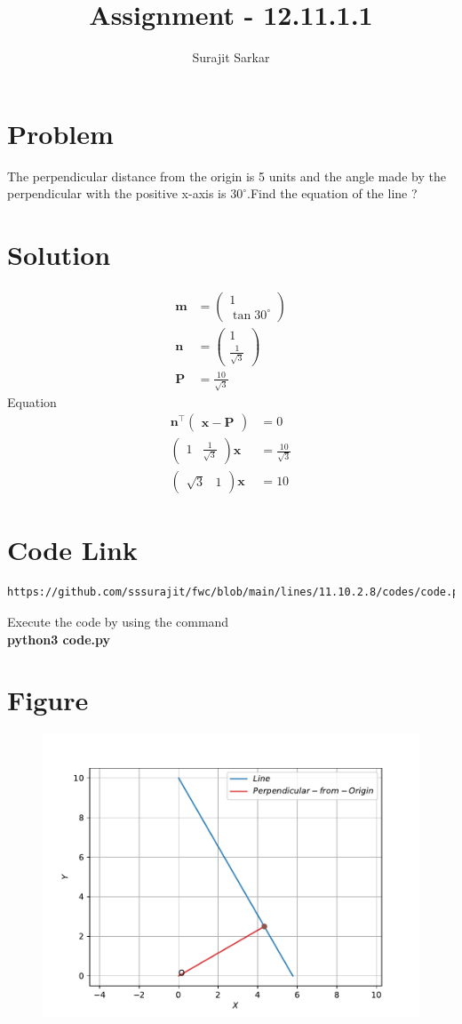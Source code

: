 \documentclass[journal,12pt,twocolumn]{IEEEtran}
\title{\mytitle}
\title{
Assignment - 12.11.1.1
}
\author{Surajit Sarkar}
\newcommand{\myvec}[1]{\ensuremath{\begin{pmatrix}#1\end{pmatrix}}}
\let\vec\mathbf
\begin{document}
\maketitle
\tableofcontents
\bigskip
\section{\textbf{Problem}}
The perpendicular distance from the origin is 5 units and the angle made by the perpendicular with the positive x-axis is $30^{\circ}$.Find the equation of the line ?
\section{\textbf{Solution}}
\begin{align}
\vec{m}&=\myvec{1\\\tan30^{\circ}}\\
\vec{n}&=\myvec{1\\\frac{1}{\sqrt{3}}}\\
\vec{P}&=\frac{10}{\sqrt{3}}
\end{align}
Equation
\begin{align}
    \vec{n}^{\top}\myvec{\vec{x}-\vec{P}}&=0\\
    \myvec{1&\frac{1}{\sqrt{3}}}\vec{x}&=\frac{10}{\sqrt{3}}\\
    \myvec{\sqrt{3}&1}\vec{x}&=10
\end{align}
\section{\textbf{Code Link}}
\begin{lstlisting}
https://github.com/sssurajit/fwc/blob/main/lines/11.10.2.8/codes/code.py
\end{lstlisting}
Execute the code by using the command\\
\textbf{python3 code.py}\\
\section{\textbf{Figure}}
\begin{figure}[!h]
\centering
\includegraphics[width=\columnwidth]{fig.pdf}
\caption{}
\label{fig:fig}
\end{figure}
\end{document}
